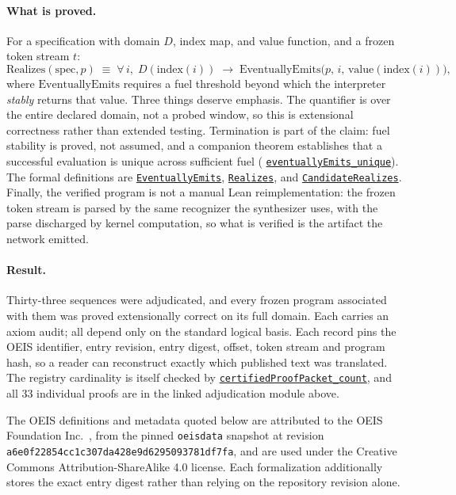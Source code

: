\documentclass[11pt]{article}
\newcommand{\code}[1]{\texttt{#1}}
\newcommand{\formalcommit}{f3a31db36bb2f944312ee31c1d86c2758109e83a}
\newcommand{\formalblob}{https://github.com/zariuq/MeTTapedia/blob/\formalcommit/lean/mettapedia/Mettapedia}
\newcommand{\leansource}[3]{%
  \href{\formalblob/#1\#L#2}{\nolinkurl{#3}}}
\begin{document}
\paragraph{What is proved.} For a specification with domain $D$, index map, and value
function, and a frozen token stream $t$:
\[
\mathrm{Realizes}(\mathrm{spec}, p) \;\equiv\;
\forall\, i,\; D(\mathrm{index}(i)) \;\rightarrow\;
\mathrm{EventuallyEmits}\bigl(p,\, i,\, \mathrm{value}(\mathrm{index}(i))\bigr),
\]
where $\mathrm{EventuallyEmits}$ requires a fuel threshold beyond which the interpreter
\emph{stably} returns that value. Three things deserve emphasis. The quantifier is over
the entire declared domain, not a probed window, so this is extensional correctness rather
than extended testing. Termination is part of the claim: fuel stability is proved, not
assumed, and a companion theorem establishes that a successful evaluation is unique
across sufficient fuel
(\leansource{GSLT/LanguageDef/Gauthier/OEISSequenceSemantics.lean}{61-L71}{eventuallyEmits_unique}).
The formal definitions are
\leansource{GSLT/LanguageDef/Gauthier/OEISSequenceSemantics.lean}{42-L44}{EventuallyEmits},
\leansource{GSLT/LanguageDef/Gauthier/OEISSequenceSemantics.lean}{74-L76}{Realizes}, and
\leansource{GSLT/LanguageDef/Gauthier/OEISSequenceSemantics.lean}{78-L79}{CandidateRealizes}.
Finally, the verified program is not a manual Lean
reimplementation: the frozen token stream is parsed by the same recognizer the synthesizer
uses, with the parse discharged by kernel computation, so what is verified is the artifact
the network emitted.

\paragraph{Result.} Thirty-three sequences were adjudicated, and every frozen program
associated with them was proved extensionally correct on its full domain. Each carries an
axiom audit; all depend only on the standard logical basis. Each record pins the OEIS
identifier, entry revision, entry digest, offset, token stream and program hash, so a
reader can reconstruct exactly which published text was translated. The registry cardinality
is itself checked by
\leansource{MachineLearning/SearchGuidance/ProgramDiscovery/ProofEvidenceNonIndependence.lean}{148-L149}{certifiedProofPacket_count},
and all 33 individual proofs are in the linked adjudication module above.

The OEIS definitions and metadata quoted below are attributed to the OEIS Foundation
Inc.~\cite{oeis}, from the pinned \code{oeisdata} snapshot at revision
\code{a6e0f22854cc1c307da428e9d6295093781df7fa}, and are used under the Creative Commons
Attribution-ShareAlike 4.0 license. Each formalization additionally stores the exact entry
digest rather than relying on the repository revision alone.
\end{document}
